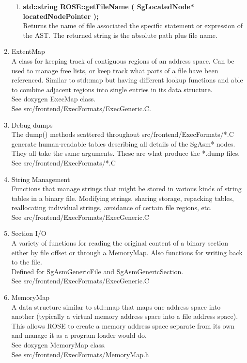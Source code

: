 \begin{enumerate}
\begin{enumerate}
      \item {\bf std::string ROSE::getFileName ( SgLocatedNode* locatedNodePointer );} \\
      Returns the name of file associated the specific statement or expression of the AST.
      The returned string is the absolute path plus file name.
   \end{enumerate}

   \item ExtentMap \\
   A class for keeping track of contiguous regions of an address
   space. Can be used to manage free lists, or keep track what
   parts of a file have been referenced. Similar to std::map but
   having different lookup functions and able to combine adjacent
   regions into single entries in its data structure. \\
   See doxygen ExecMap class. \\
   See src/frontend/ExecFormats/ExecGeneric.C.

   \item Debug dumps \\
   The dump() methods scattered throughout
   src/frontend/ExecFormats/*.C generate human-readable tables
   describing all details of the SgAsm* nodes. They all take the
   same arguments. These are what produce the *.dump files. \\
   See src/frontend/ExecFormats/*.C

   \item String Management \\
   Functions that manage strings that might be stored in various
   kinds of string tables in a binary file.  Modifying strings,
   sharing storage, repacking tables, reallocating individual
   strings, avoidance of certain file regions, etc. \\
   See src/frontend/ExecFormats/ExecGeneric.C

   \item Section I/O \\
   A variety of functions for reading the original content of a
   binary section either by file offset or through a
   MemoryMap. Also functions for writing back to the file. \\
   Defined for SgAsmGenericFile and SgAsmGenericSection. \\
   See src/frontend/ExecFormats/ExecGeneric.C

   \item MemoryMap \\
   A data structure similar to std::map that maps one address
   space into another (typically a virtual memory address space
   into a file address space).  This allows ROSE to create a
   memory address space separate from its own and manage it as a
   program loader would do. \\
   See doxygen MemoryMap class. \\
   See src/frontend/ExecFormats/MemoryMap.h


\end{enumerate}
